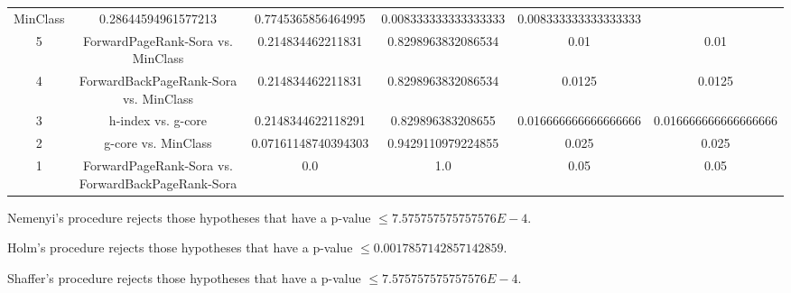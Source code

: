 \documentclass[a4paper,10pt]{article}
\begin{document}
\begin{landscape}
\begin{table}[!htp]
\begin{tabular}{cccccc}
MinClass&0.28644594961577213&0.7745365856464995&0.008333333333333333&0.008333333333333333\\5&ForwardPageRank-Sora vs. MinClass&0.214834462211831&0.8298963832086534&0.01&0.01\\4&ForwardBackPageRank-Sora vs. MinClass&0.214834462211831&0.8298963832086534&0.0125&0.0125\\3&h-index vs. g-core&0.2148344622118291&0.829896383208655&0.016666666666666666&0.016666666666666666\\2&g-core vs. MinClass&0.07161148740394303&0.9429110979224855&0.025&0.025\\1&ForwardPageRank-Sora vs. ForwardBackPageRank-Sora&0.0&1.0&0.05&0.05\\\hline
\end{tabular}
\end{table}
Nemenyi's procedure rejects those hypotheses that have a p-value $\le7.575757575757576E-4$.


Holm's procedure rejects those hypotheses that have a p-value $\le0.0017857142857142859$.


Shaffer's procedure rejects those hypotheses that have a p-value $\le7.575757575757576E-4$.



\end{landscape}
\end{document}
